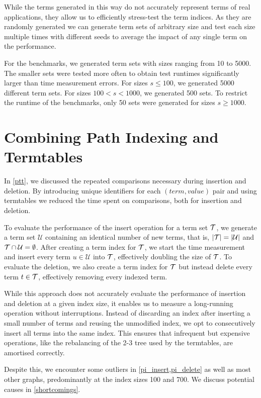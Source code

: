 While the terms generated in this way do not accurately represent terms of real applications, they allow us to efficiently stress-test the term indices. As they are randomly generated we can generate term sets of arbitrary size and test each size multiple times with different seeds to average the impact of any single term on the performance.

For the benchmarks, we generated term sets with sizes ranging from 10 to 5000. The smaller sets were tested more often to obtain test runtimes significantly larger than time measurement errors. For sizes $s \leq 100$, we generated 5000 different term sets. For sizes $100 < s < 1000$, we generated 500 sets. To restrict the runtime of the benchmarks, only 50 sets were generated for sizes $s \geq 1000$.


\section{Combining Path Indexing and Termtables} \label{pathindex_termtab}
In \cref{ptt}, we discussed the repeated comparisons necessary during insertion and deletion. By introducing unique identifiers for each $(term,value)$ pair and using termtables we reduced the time spent on comparisons, both for insertion and deletion.

To evaluate the performance of the insert operation for a term set $\mathcal{T}$, we generate a term set $\mathcal{U}$ containing an identical number of new terms, that is, $|\mathcal{T}| = |\mathcal{U}|$ and $\mathcal{T} \cap \mathcal{U} = \emptyset$. After creating a term index for $\mathcal{T}$, we start the time measurement and insert every term $u \in \mathcal{U}$ into $\mathcal{T}$, effectively doubling the size of $\mathcal{T}$. To evaluate the deletion, we also create a term index for $\mathcal{T}$ but instead delete every term $t \in \mathcal{T}$, effectively removing every indexed term.

While this approach does not accurately evaluate the performance of insertion and deletion at a given index size, it enables us to measure a long-running operation without interruptions. Instead of discarding an index after inserting a small number of terms and reusing the unmodified index, we opt to consecutively insert all terms into the same index. This ensures that infrequent but expensive operations, like the rebalancing of the 2-3 tree used by the termtables, are amortised correctly.

Despite this, we encounter some outliers in \cref{pi_insert,pi_delete} as well as most other graphs, predominantly at the index sizes 100 and 700. We discuss potential causes in \cref{shortcomings}.

